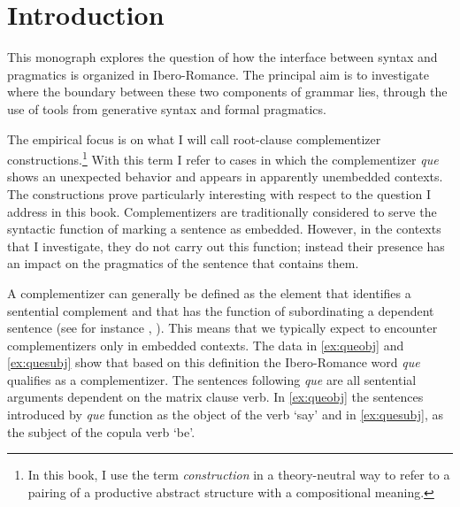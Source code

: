 
\chapter{Introduction}\label{sec:1}


This monograph explores the question of how the interface between syntax and pragmatics is organized in Ibero-Romance. The principal aim is to investigate where the boundary between these two components of grammar lies, through the use of tools from generative syntax and formal  pragmatics. 

The empirical focus is on what I will call root-clause complementizer constructions.\footnote{In this book, I use the term \emph{construction} in a theory-neutral way to refer to a pairing of a productive abstract structure with a compositional meaning.}  With this term I refer to cases in which the complementizer \emph{que} shows an unexpected behavior and appears in apparently unembedded contexts. The constructions prove particularly interesting with respect to the question I address in this book. Complementizers are traditionally considered to serve the  syntactic function of marking a sentence as embedded. However, in the contexts that I investigate, they do not carry out this function; instead their presence has an impact on the pragmatics of the sentence that contains them. 

A complementizer can generally be defined as the element that identifies a sentential complement  and  that  has the   function of subordinating a dependent sentence (see for instance \citealt{Noonan2007}, \citealt{Kehayov2016}). This means that we typically expect to encounter complementizers only in embedded contexts.  The data in \eqref{ex:queobj} and \eqref{ex:quesubj} show that based on this definition the Ibero-Romance word \emph{que} qualifies as a complementizer. The sentences following \emph{que} are all sentential  arguments dependent on the matrix clause verb. In \eqref{ex:queobj} the sentences introduced by \emph{que} function as the object of the verb `say' and  in \eqref{ex:quesubj}, as the subject of the copula verb `be'.


